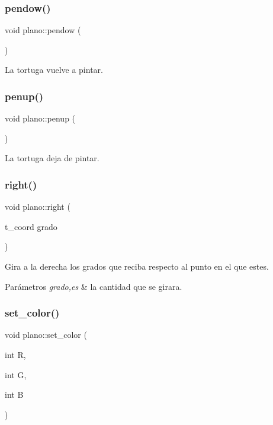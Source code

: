 \subsubsection{\texorpdfstring{pendow()}{pendow()}}
{\footnotesize\ttfamily void plano\+::pendow (\begin{DoxyParamCaption}{ }\end{DoxyParamCaption})}

La tortuga vuelve a pintar. \mbox{\label{classplano_a48e4fbc9361ecaffe8a18545825ae19b}} 
\subsubsection{\texorpdfstring{penup()}{penup()}}
{\footnotesize\ttfamily void plano\+::penup (\begin{DoxyParamCaption}{ }\end{DoxyParamCaption})}

La tortuga deja de pintar. \mbox{\label{classplano_a350bd814b14e4a876b601e608c4b7217}} 
\subsubsection{\texorpdfstring{right()}{right()}}
{\footnotesize\ttfamily void plano\+::right (\begin{DoxyParamCaption}\item[{t\+\_\+coord}]{grado }\end{DoxyParamCaption})}

Gira a la derecha los grados que reciba respecto al punto en el que estes. 
\begin{DoxyParams}{Parámetros}
{\em grado,es} & la cantidad que se girara. \\
\hline
\end{DoxyParams}
\mbox{\label{classplano_a5758a4e96e2140941dd150e91e6029fd}} 
\subsubsection{\texorpdfstring{set\+\_\+color()}{set\_color()}}
{\footnotesize\ttfamily void plano\+::set\+\_\+color (\begin{DoxyParamCaption}\item[{int}]{R,  }\item[{int}]{G,  }\item[{int}]{B }\end{DoxyParamCaption})}

